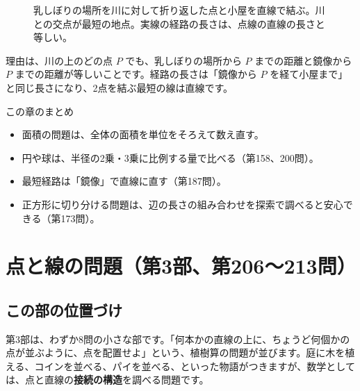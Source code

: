 \documentclass[a4paper,11pt,openany]{ltjsbook}
\begin{document}
\begin{figure}[htbp]
\centering
{}
\caption{乳しぼりの場所を川に対して折り返した点と小屋を直線で結ぶ。川との交点が最短の地点。実線の経路の長さは、点線の直線の長さと等しい。}
\end{figure}

理由は、川の上のどの点 $P$ でも、乳しぼりの場所から $P$ までの距離と鏡像から $P$ までの距離が等しいことです。経路の長さは「鏡像から $P$ を経て小屋まで」と同じ長さになり、2点を結ぶ最短の線は直線です。

\begin{pointbox}{この章のまとめ}
\begin{itemize}[leftmargin=*]
\item 面積の問題は、全体の面積を単位をそろえて数え直す。
\item 円や球は、半径の2乗・3乗に比例する量で比べる（第158、200問）。
\item 最短経路は「鏡像」で直線に直す（第187問）。
\item 正方形に切り分ける問題は、辺の長さの組み合わせを探索で調べると安心できる（第173問）。
\end{itemize}
\end{pointbox}

\chapter{点と線の問題（第3部、第206〜213問）}

\section{この部の位置づけ}

第3部は、わずか8問の小さな部です。「何本かの直線の上に、ちょうど何個かの点が並ぶように、点を配置せよ」という、植樹算の問題が並びます。庭に木を植える、コインを並べる、パイを並べる、といった物語がつきますが、数学としては、点と直線の\textbf{接続の構造}を調べる問題です。
\end{document}
